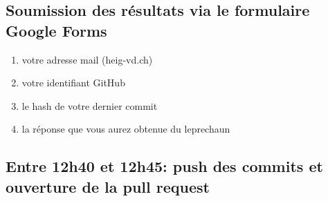 \documentclass[a4paper, french, 10pt]{article} %
\begin{document}
\subsection{Soumission des résultats via le formulaire Google Forms}

\begin{enumerate}
\item votre adresse mail (heig-vd.ch)
\item votre identifiant GitHub
\item le hash de votre dernier commit
\item la réponse que vous aurez obtenue du leprechaun
\end{enumerate}

\subsection{Entre 12h40 et 12h45: push des commits et ouverture de la pull request}




\end{document}
